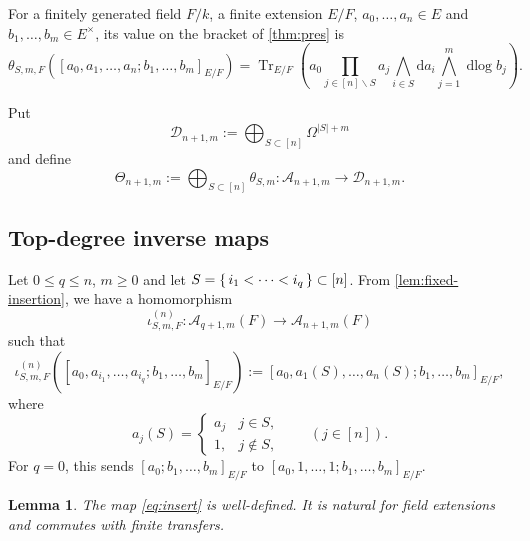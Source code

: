 \documentclass[a4paper,12pt,reqno]{amsart}
\numberwithin{equation}{section}
\newtheorem{lem}[lem]{Lemma}
\theoremstyle{definition}
\DeclareMathOperator{\dlog}{dlog}
\DeclareMathOperator{\Tr}{Tr}
\renewcommand{\d}{\mathrm{d}}
\newcommand{\Acal}{\mathcal{A}}
\newcommand{\Dcal}{\mathcal{D}}
\begin{document}
For a finitely generated field $F/k$, a finite extension $E/F$, 
$a_0,\ldots,a_n\in E$ and $b_1,\dots, b_m\in E^\times$, its value on the bracket of \autoref{thm:pres} is
\begin{equation}\label{eq:thetaF}
 \theta_{S,m,F}([a_0,a_1,\ldots,a_n;b_1,\dots,b_m]_{E/F})
 =
 \Tr_{E/F}\left(
 a_0\prod_{j\in[n]\smallsetminus S}a_j
 \bigwedge_{i\in S}\d a_i
 \bigwedge_{j=1}^m \dlog b_j
 \right).
\end{equation}


Put
\begin{equation}\label{eq:Dsum}
 \Dcal_{n+1,m}:=\bigoplus_{S\subset[n]}\Omega^{|S|+m}
\end{equation}
and define
\begin{equation}\label{eq:Theta}
\Theta_{n+1,m}:=\bigoplus_{S\subset[n]}\theta_{S,m}:
 \Acal_{n+1,m}\to\Dcal_{n+1,m}.
\end{equation}



\subsection{Top-degree inverse maps}\label{sec:inv}

Let $0\leq q\leq n$, $m\ge 0$ and let
$S=\set{i_1<\cdots<i_q}\subset[n]$. 
From \autoref{lem:fixed-insertion}, we have a homomorphism 
\begin{equation}\label{eq:insert}
 \iota^{(n)}_{S,m,F}:\Acal_{q+1,m}(F)\to\Acal_{n+1,m}(F)
\end{equation}
such that
\begin{equation}\label{eq:insfld}
 \iota^{(n)}_{S,m,F}
 ([a_0,a_{i_1},\ldots,a_{i_q};b_1,\dots,b_m]_{E/F})
 :=[a_0,a_1(S),\ldots,a_n(S);b_1,\dots,b_m]_{E/F},
\end{equation}
where 
\[
a_j(S) = \begin{cases}
	a_j & j \in S,\\
	1, & j\notin S,
\end{cases}\qquad (j\in [n]).
\]
For $q=0$, this sends
$[a_0;b_1,\ldots,b_m]_{E/F}$ to
$[a_0,1,\ldots,1;b_1,\ldots,b_m]_{E/F}$.

\begin{lem}\label{lem:insert}
 The map \eqref{eq:insert} is well-defined.  
 It is natural for field
 extensions and commutes with finite transfers.
\end{lem}
\end{document}
